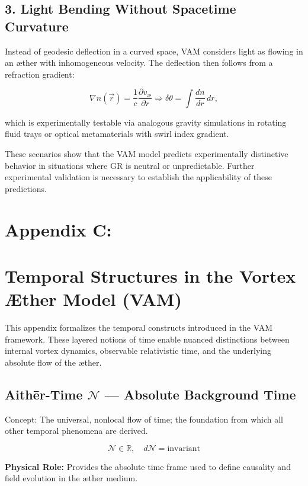 \documentclass[a4paper,12pt]{article}
\begin{document}
\subsection*{3. Light Bending Without Spacetime Curvature}

Instead of geodesic deflection in a curved space, VAM considers light as flowing in an æther with inhomogeneous velocity. The deflection then follows from a refraction gradient:

\begin{equation}
    \nabla n(\vec{r}) = \frac{1}{c} \frac{\partial v_\text{\ae}}{\partial r} \Rightarrow \delta \theta = \int \frac{dn}{dr} \, dr,
\end{equation}

which is experimentally testable via analogous gravity simulations in rotating fluid trays or optical metamaterials with swirl index gradient.

\bigskip

These scenarios show that the VAM model predicts experimentally distinctive behavior in situations where GR is neutral or unpredictable. Further experimental validation is necessary to establish the applicability of these predictions.
\section*{Appendix C:}\label{appendix:temporal_structures}
\section*{Temporal Structures in the Vortex Æther Model (VAM)}

This appendix formalizes the temporal constructs introduced in the VAM framework. These layered notions of time enable nuanced distinctions between internal vortex dynamics, observable relativistic time, and the underlying absolute flow of the æther.

\subsection*{Aithēr-Time $\mathcal{N}$ — Absolute Background Time}
Concept: The universal, nonlocal flow of time; the foundation from which all other temporal phenomena are derived.


\[
\mathcal{N} \in \mathbb{R}, \quad d\mathcal{N} = \text{invariant}
\]

\textbf{Physical Role:} Provides the absolute time frame used to define causality and field evolution in the æther medium.
\end{document}
